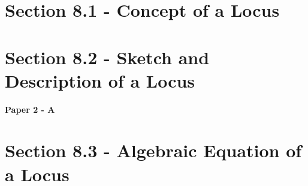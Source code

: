 \documentclass[12pt, a4paper]{article}
\begin{document}
\section*{Section 8.1 - Concept of a Locus}\label{section:5-8-1}





\section*{Section 8.2 - Sketch and Description of a Locus}\label{section:5-8-2}

\textbf{Paper 2 - A}
\begin{enumx}[label=\arabic*.,start=1]
\item {}\label{DSE2012-CoreP2-Q24} 
\item {}\label{DSE2014-CoreP2-Q24} 
\item {}\label{DSE2015-CoreP2-Q24} 
\item {}\label{DSE2019-CoreP2-Q26} 
\end{enumx}




\section*{Section 8.3 - Algebraic Equation of a Locus}\label{section:5-8-3}
\end{document}
